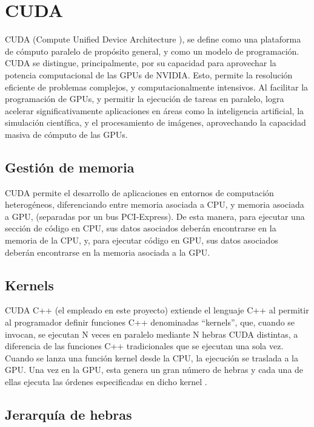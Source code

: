 \section{CUDA}


CUDA (Compute Unified Device Architecture \cite{cuda_forum}), se define como una plataforma de cómputo paralelo de propósito general, y como un modelo de programación. 
CUDA se distingue, principalmente, por su capacidad para aprovechar la potencia computacional de las GPUs de NVIDIA. Esto, permite la resolución eficiente de problemas complejos, y computacionalmente intensivos. 
Al facilitar la programación de GPUs, y permitir la ejecución de tareas en paralelo, logra acelerar significativamente aplicaciones en áreas como la inteligencia artificial, la simulación científica, y el procesamiento de imágenes, aprovechando la capacidad masiva de cómputo de las GPUs. \\

\subsection{Gestión de memoria}

CUDA permite el desarrollo de aplicaciones en entornos de computación heterogéneos, diferenciando entre memoria asociada a CPU, y memoria asociada a GPU, (separadas por un bus PCI-Express). De esta manera, para ejecutar una sección de código en CPU, sus datos asociados deberán encontrarse en la memoria de la CPU, y, para ejecutar código en GPU, sus datos asociados deberán encontrarse en la memoria asociada a la GPU. 

\subsection{Kernels}

CUDA C++ (el empleado en este proyecto) extiende el lenguaje C++ al permitir al programador definir funciones C++ denominadas ``kernels'', que, cuando se invocan, se ejecutan N veces en paralelo mediante N hebras CUDA distintas, a diferencia de las funciones C++ tradicionales que se ejecutan  una sola vez. Cuando se lanza una función kernel desde la CPU, la ejecución se traslada a la GPU. Una vez en la GPU, esta genera un gran número de hebras y cada una de ellas ejecuta las órdenes especificadas en dicho kernel \cite{cuda_kernels}. \\

\subsection{Jerarquía de hebras}

